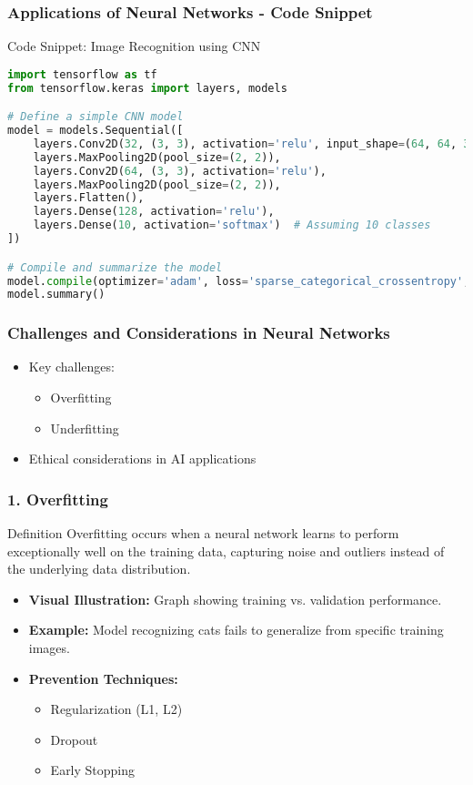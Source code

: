 \documentclass[aspectratio=169]{beamer}
\begin{document}
\begin{frame}[fragile]
    \frametitle{Applications of Neural Networks - Code Snippet}
    \begin{block}{Code Snippet: Image Recognition using CNN}
    \begin{lstlisting}[language=Python]
import tensorflow as tf
from tensorflow.keras import layers, models

# Define a simple CNN model
model = models.Sequential([
    layers.Conv2D(32, (3, 3), activation='relu', input_shape=(64, 64, 3)),
    layers.MaxPooling2D(pool_size=(2, 2)),
    layers.Conv2D(64, (3, 3), activation='relu'),
    layers.MaxPooling2D(pool_size=(2, 2)),
    layers.Flatten(),
    layers.Dense(128, activation='relu'),
    layers.Dense(10, activation='softmax')  # Assuming 10 classes
])

# Compile and summarize the model
model.compile(optimizer='adam', loss='sparse_categorical_crossentropy', metrics=['accuracy'])
model.summary()
    \end{lstlisting}
    \end{block}
\end{frame}

\begin{frame}[fragile]
    \frametitle{Challenges and Considerations in Neural Networks}
    \begin{itemize}
        \item Key challenges:
        \begin{itemize}
            \item Overfitting
            \item Underfitting
        \end{itemize}
        \item Ethical considerations in AI applications
    \end{itemize}
\end{frame}

\begin{frame}[fragile]
    \frametitle{1. Overfitting}
    \begin{block}{Definition}
        Overfitting occurs when a neural network learns to perform exceptionally well on the training data, capturing noise and outliers instead of the underlying data distribution.
    \end{block}
    
    \begin{itemize}
        \item \textbf{Visual Illustration:} Graph showing training vs. validation performance.
        \item \textbf{Example:} Model recognizing cats fails to generalize from specific training images.
        \item \textbf{Prevention Techniques:}
        \begin{itemize}
            \item Regularization (L1, L2)
            \item Dropout
            \item Early Stopping
        \end{itemize}
    \end{itemize}
\end{frame}
\end{document}
